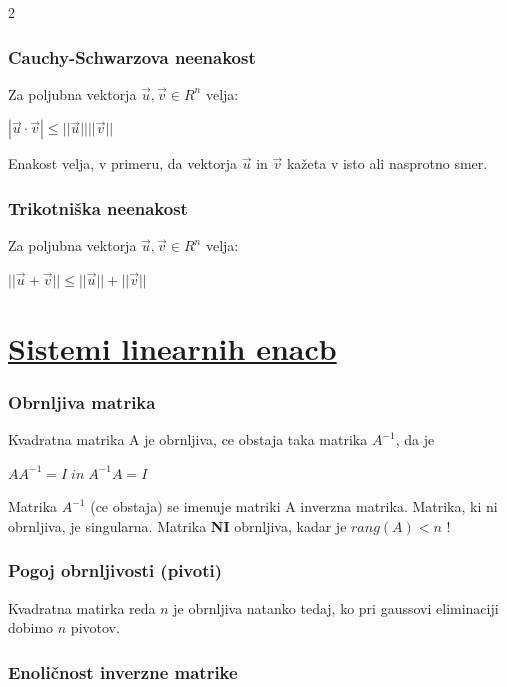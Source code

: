 \documentclass{article}
\begin{document}
\begin{multicols}{2}
	\subsubsection{Cauchy-Schwarzova neenakost}

	Za poljubna vektorja $\vec{u}, \vec{v} \in R^{n}$ velja:

	\begin{center}
		$|\vec{u} \cdot \vec{v}| \leq ||\vec{u}||||\vec{v}||$
	\end{center}

	Enakost velja, v primeru, da vektorja $\vec{u}$ in $\vec{v}$ kažeta v isto ali nasprotno smer.

	\subsubsection{Trikotniška neenakost}

	Za poljubna vektorja $\vec{u}, \vec{v} \in R^{n}$ velja:

	\begin{center}
		$||\vec{u} + \vec{v}|| \leq ||\vec{u}|| + ||\vec{v}||$
	\end{center}

	\section{\underline{Sistemi linearnih enacb}}

	\subsubsection{Obrnljiva matrika}

	Kvadratna matrika A je obrnljiva, ce obstaja taka matrika
	$A^{-1}$, da je
	\begin{center}
		$AA^{-1} = I\;
			in\;
			A^{-1}A = I
		$
	\end{center}
	Matrika $A^{-1}$ (ce obstaja) se imenuje matriki A inverzna matrika.
	Matrika, ki ni obrnljiva, je singularna. Matrika \textbf{NI} obrnljiva, kadar je
	$rang(A) < n$ !

	\subsubsection{Pogoj obrnljivosti (pivoti)}

	Kvadratna matirka reda $n$ je obrnljiva natanko tedaj, ko pri
	gaussovi eliminaciji dobimo $n$ pivotov.

	\subsubsection{Enoličnost inverzne matrike}


\end{multicols}
\end{document}
